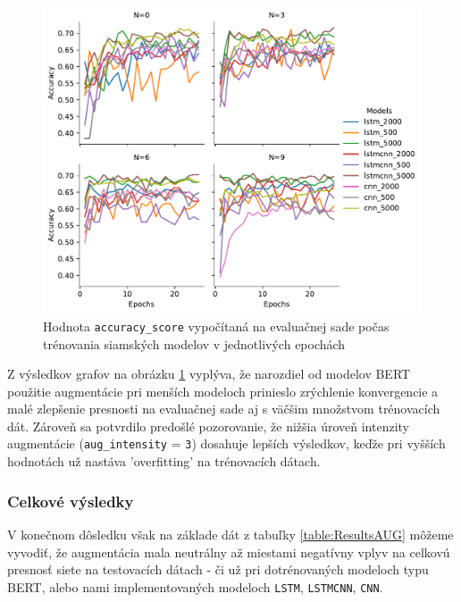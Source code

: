 \documentclass[a4paper, 16pt]{article}
\begin{document}
\begin{figure}[H]
    \centering
    \includegraphics[width=15cm]{imgs/NN_graph.pdf}
    \caption{Hodnota \texttt{accuracy\_score} vypočítaná na evaluačnej sade počas trénovania siamských modelov v jednotlivých epochách}
    \label{fig:2}
\end{figure}

Z výsledkov grafov na obrázku \ref{fig:2} vyplýva, že narozdiel od modelov BERT použitie augmentácie pri menších modeloch prinieslo zrýchlenie konvergencie a malé zlepšenie presnosti na evaluačnej sade aj s väčšim množstvom trénovacích dát. Zároveň sa potvrdilo predošlé pozorovanie, že nižšia úroveň intenzity augmentácie (\texttt{aug\_intensity} = \texttt{3}) dosahuje lepších výsledkov, keďže pri vyšších hodnotách už nastáva 'overfitting' na trénovacích dátach.

\subsubsection{Celkové výsledky}

V konečnom dôsledku však na základe dát z tabuľky \ref{table:ResultsAUG} môžeme vyvodiť, že augmentácia mala neutrálny až miestami negatívny vplyv na celkovú presnosť siete na testovacích dátach - či už pri dotrénovaných modeloch typu BERT, alebo nami implementovaných modeloch \texttt{LSTM}, \texttt{LSTMCNN}, \texttt{CNN}.
\end{document}
